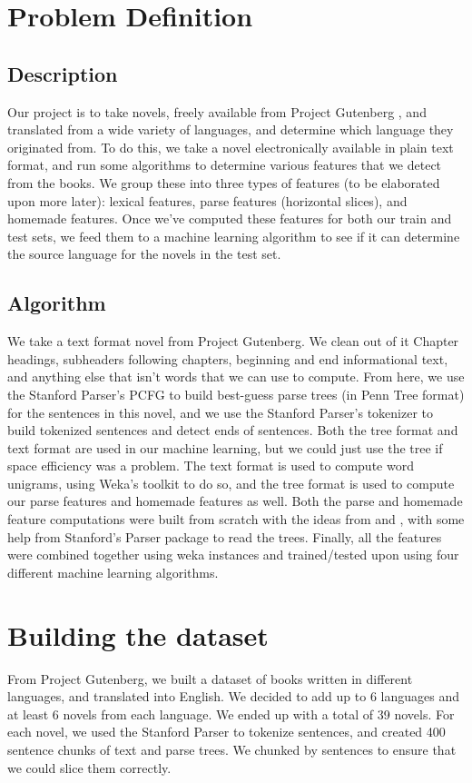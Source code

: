 \documentclass[10pt]{article}
\begin{document}
\section{Problem Definition}
\subsection{Description}
Our project is to take novels, freely available from Project Gutenberg \cite{gutenberg}, and translated from a wide variety of languages, and determine which language they originated from. To do this, we take a novel electronically available in plain text format, and run some algorithms to determine various features that we detect from the books. We group these into three types of features (to be elaborated upon more later): lexical features, parse features (horizontal slices), and homemade features. Once we've computed these features for both our train and test sets, we feed them to a machine learning algorithm to see if it can determine the source language for the novels in the test set. 

\subsection{Algorithm}
We take a text format novel from Project Gutenberg. We clean out of it Chapter headings, subheaders following chapters, beginning and end informational text, and anything else that isn't words that we can use to compute. From here, we use the Stanford Parser's PCFG \cite{Stanford} to build best-guess parse trees (in Penn Tree format) for the sentences in this novel, and we use the Stanford Parser's tokenizer to build tokenized sentences and detect ends of sentences. Both the tree format and text format are used in our machine learning, but we could just use the tree if space efficiency was a problem. The text format is used to compute word unigrams, using Weka's toolkit \cite{weka} to do so, and the tree format is used to compute our parse features and homemade features as well. Both the parse and homemade feature computations were built from scratch with the ideas from  \cite{homemade} and  \cite{Parse}, with some help from Stanford's Parser package to read the trees. Finally, all the features were combined together using weka instances and trained/tested upon using four different machine learning algorithms.



\section{Building the dataset}
From Project Gutenberg, we built a dataset of books written in different languages, and translated into English. We decided to add up to 6 languages and at least 6 novels from each language. We ended up with a total of 39 novels. For each novel, we used the Stanford Parser to tokenize sentences, and created 400 sentence chunks of text and parse trees. We chunked by sentences to ensure that we could slice them correctly. 
\end{document}
